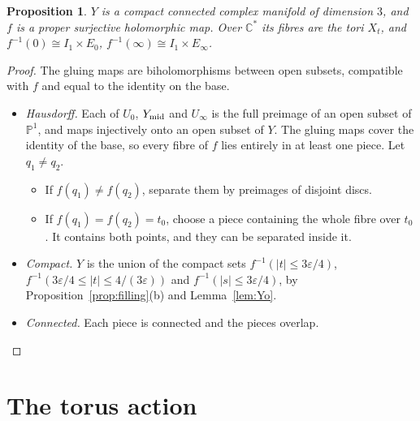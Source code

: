 \documentclass{article}
\newtheorem{proposition}[theorem]{Proposition}
\theoremstyle{definition}
\theoremstyle{plain}
\newcommand{\C}{\mathbb{C}}
\newcommand{\PP}{\mathbb{P}}
\begin{document}
\begin{proposition}\label{prop:Y}
$Y$ is a compact connected complex manifold of dimension $3$, and $f$ is a proper
surjective holomorphic map. Over $\C^*$ its fibres are the tori $X_t$, and
$f^{-1}(0)\cong I_1\times E_0$, $f^{-1}(\infty)\cong I_1\times E_\infty$.
\end{proposition}
\begin{proof}
The gluing maps are biholomorphisms between open subsets, compatible with $f$ and
equal to the identity on the base.
\begin{itemize}
\item \emph{Hausdorff.} Each of $U_0$, $Y_{\rm mid}$ and $U_\infty$ is the full
  preimage of an open subset of $\PP^1$, and maps injectively onto an open subset of
  $Y$. The gluing maps cover the identity of the base, so every fibre of $f$ lies
  entirely in at least one piece. Let $q_1\ne q_2$.
  \begin{itemize}
  \item If $f(q_1)\ne f(q_2)$, separate them by preimages of disjoint discs.
  \item If $f(q_1)=f(q_2)=t_0$, choose a piece containing the whole fibre over $t_0$.
    It contains both points, and they can be separated inside it.
  \end{itemize}
\item \emph{Compact.} $Y$ is the union of the compact sets
  $f^{-1}(|t|\le3\varepsilon/4)$, $f^{-1}(3\varepsilon/4\le|t|\le4/(3\varepsilon))$ and
  $f^{-1}(|s|\le3\varepsilon/4)$, by Proposition~\ref{prop:filling}(b) and
  Lemma~\ref{lem:Yo}.
\item \emph{Connected.} Each piece is connected and the pieces overlap.
\end{itemize}
\end{proof}

\section{The torus action}\label{sec:torus}
\end{document}
